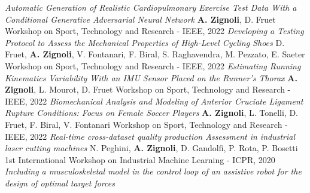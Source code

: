 \documentclass[helvetica,openbib,logo,notitle,flagCMYK,totpages]{europecv}
\begin{document}
\begin{europecv}
{	       \newline
	       \emph{Automatic Generation of Realistic Cardiopulmonary Exercise Test Data With a Conditional Generative Adversarial Neural Network}\newline
	       \textbf{A. Zignoli}, D. Fruet \newline
	       Workshop on Sport, Technology and Research - IEEE, 2022
	       \newline
	       \newline
	       \emph{Developing a Testing Protocol to Assess the Mechanical Properties of High-Level Cycling Shoes}\newline
	       D. Fruet, \textbf{A. Zignoli}, V. Fontanari, F. Biral, S. Raghavendra, M. Pezzato, E. Saeter \newline
	       Workshop on Sport, Technology and Research - IEEE, 2022
	       \newline
	       \newline
	       \emph{Estimating Running Kinematics Variability With an IMU Sensor Placed on the Runner's Thorax}\newline
	       \textbf{A. Zignoli}, L. Mourot, D. Fruet \newline
	       Workshop on Sport, Technology and Research - IEEE, 2022
	       \newline
	       \newline
	       \emph{Biomechanical Analysis and Modeling of Anterior Cruciate Ligament Rupture Conditions: Focus on Female Soccer Players}\newline
	       \textbf{A. Zignoli}, L. Tonelli, D. Fruet, F. Biral, V. Fontanari \newline
	       Workshop on Sport, Technology and Research - IEEE, 2022
	       \newline
	       \newline
	       \emph{Real-time cross-dataset quality production Assessment in industrial laser cutting machines}\newline
	       N. Peghini, \textbf{A. Zignoli}, D. Gandolfi, P. Rota, P. Bosetti \newline
	       1st International Workshop on Industrial Machine Learning - ICPR, 2020
	       \newline
	       \newline
	       \emph{Including a musculoskeletal model in the control loop of an assistive robot for the design of optimal target forces}             \newline
}
\end{europecv}
\end{document}
